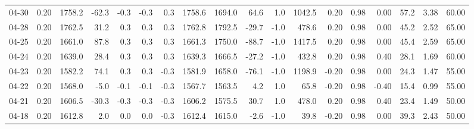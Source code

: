 \begin{threeparttable}
{\begin{tabular}{lrrrrrrrrrrrrrrrrr}
  04-30 &     0.20 & 1758.2 &             -62.3 &              -0.3 &               -0.3 &                0.3 & 1758.6 & 1694.0 &       64.6 &                      1.0 &              1042.5 &       0.20 &      0.98 &           0.00 &             57.2 &            3.38 &                  60.00 \\
  04-28 &     0.20 & 1762.5 &              31.2 &               0.3 &                0.3 &                0.3 & 1762.8 & 1792.5 &      -29.7 &                     -1.0 &               478.6 &       0.20 &      0.98 &           0.00 &             45.2 &            2.52 &                  65.00 \\
  04-25 &     0.20 & 1661.0 &              87.8 &               0.3 &                0.3 &                0.3 & 1661.3 & 1750.0 &      -88.7 &                     -1.0 &              1417.5 &       0.20 &      0.98 &           0.00 &             45.4 &            2.59 &                  65.00 \\
  04-24 &     0.20 & 1639.0 &              28.4 &               0.3 &                0.3 &                0.3 & 1639.3 & 1666.5 &      -27.2 &                     -1.0 &               432.8 &       0.20 &      0.98 &           0.40 &             28.1 &            1.69 &                  60.00 \\
  04-23 &     0.20 & 1582.2 &              74.1 &               0.3 &                0.3 &               -0.3 & 1581.9 & 1658.0 &      -76.1 &                     -1.0 &              1198.9 &      -0.20 &      0.98 &           0.00 &             24.3 &            1.47 &                  55.00 \\
  04-22 &     0.20 & 1568.0 &              -5.0 &              -0.1 &               -0.1 &               -0.3 & 1567.7 & 1563.5 &        4.2 &                      1.0 &                65.8 &      -0.20 &      0.98 &          -0.40 &             15.4 &            0.99 &                  55.00 \\
  04-21 &     0.20 & 1606.5 &             -30.3 &              -0.3 &               -0.3 &               -0.3 & 1606.2 & 1575.5 &       30.7 &                      1.0 &               478.0 &       0.20 &      0.98 &           0.40 &             23.4 &            1.49 &                  50.00 \\
  04-18 &     0.20 & 1612.8 &               2.0 &               0.0 &                0.0 &               -0.3 & 1612.4 & 1615.0 &       -2.6 &                     -1.0 &                39.8 &      -0.20 &      0.98 &           0.00 &             39.3 &            2.43 &                  50.00 \\

\end{tabular}}
\end{threeparttable}
